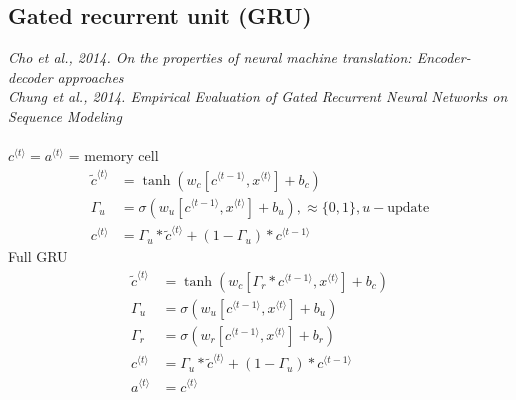 %
\subsection{Gated recurrent unit (GRU)}
\textit{Cho et al., 2014. On the properties of neural machine translation: Encoder-decoder approaches}\\
\textit{Chung et al., 2014. Empirical Evaluation of Gated Recurrent Neural Networks on Sequence Modeling}\\
\\
$c^{\langle t \rangle} = a^{\langle t \rangle}$ = memory cell
\begin{align}
\tilde{c}^{\langle t \rangle} &= \tanh(w_c[c^{\langle t-1 \rangle}, x^{\langle t \rangle} ] + b_c)\\
\Gamma_u &= \sigma (w_u[c^{\langle t-1 \rangle}, x^{\langle t \rangle}] + b_u), \approx \{0, 1\}, u - \text{update}\\
c^{\langle t \rangle} &= \Gamma_u * \tilde{c}^{\langle t \rangle} + (1- \Gamma_u) * c^{\langle t-1 \rangle}
\end{align}
Full GRU
\begin{align}
\tilde{c}^{\langle t \rangle} &= \tanh(w_c[\Gamma_r * c^{\langle t-1 \rangle}, x^{\langle t \rangle} ] + b_c)\\
\Gamma_u &= \sigma (w_u[c^{\langle t-1 \rangle}, x^{\langle t \rangle}] + b_u)\\
\Gamma_r &= \sigma (w_r[c^{\langle t-1 \rangle}, x^{\langle t \rangle}] + b_r)\\
c^{\langle t \rangle} &= \Gamma_u * \tilde{c}^{\langle t \rangle} + (1- \Gamma_u) * c^{\langle t-1 \rangle}\\
a^{\langle t \rangle} &= c^{\langle t \rangle} 
\end{align}

%
